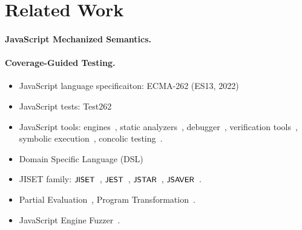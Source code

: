 \section{Related Work}\label{sec:related}

\paragraph{\textbf{JavaScript Mechanized Semantics.}}

\todo

\paragraph{\textbf{Coverage-Guided Testing.}}

\todo


\begin{itemize}
  \item JavaScript language specificaiton: ECMA-262 (ES13, 2022)~\cite{es13}
  \item JavaScript tests: Test262~\cite{test262}
  \item JavaScript tools: engines~\cite{v8, jscore, graaljs, chakra,
    spidermonkey, xs}, static analyzers~\cite{safe, safe2, tajs, wala, jsai},
    debugger~\cite{jsexplain}, verification tools~\cite{javert, javert2,
    ad-safety, javanni}, symbolic execution~\cite{symbolic-js, sym-js, expo-se},
    concolic testing~\cite{jalangi, type-conc-test}.
  \item Domain Specific Language (DSL)~\cite{dsl-survey, dsl-survey2}
  \item JISET family: $\textsf{\small JISET}$~\cite{jiset}, $\textsf{\small JEST}$~\cite{jest},
    $\textsf{\small JSTAR}$~\cite{jstar}, $\textsf{\small JSAVER}$~\cite{jsaver}.
  \item Partial Evaluation~\cite{peval, peval-survey}, Program
    Transformation~\cite{trans-ai}.
  \item JavaScript Engine Fuzzer~\cite{montage, langfuzz, die, favocado,
    codealchemist, sofi, comfort, superion, fuzzilli, jsfunfuzz,
  ifuzzer}.
\end{itemize}

\todo
